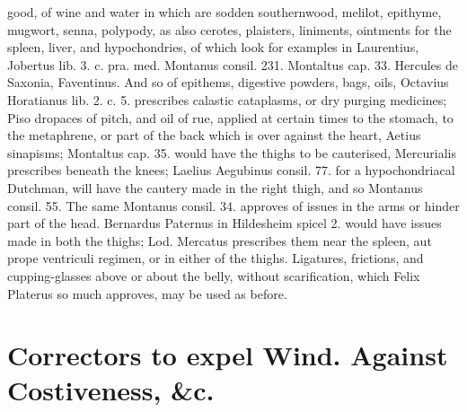 good, of wine and water in which are sodden southernwood, melilot,
epithyme, mugwort, senna, polypody, as also cerotes,
plaisters, liniments, ointments for the spleen, liver, and
hypochondries, of which look for examples in Laurentius, Jobertus lib.
3. c. pra. med. Montanus consil. 231. Montaltus cap. 33. Hercules de
Saxonia, Faventinus. And so of epithems, digestive powders, bags, oils,
Octavius Horatianus lib. 2. c. 5. prescribes calastic cataplasms, or
dry purging medicines; Piso dropaces of pitch, and oil of rue,
applied at certain times to the stomach, to the metaphrene, or part of
the back which is over against the heart, Aetius sinapisms; Montaltus
cap. 35. would have the thighs to be cauterised, Mercurialis
prescribes beneath the knees; Laelius Aegubinus consil. 77. for a
hypochondriacal Dutchman, will have the cautery made in the right
thigh, and so Montanus consil. 55. The same Montanus consil. 34.
approves of issues in the arms or hinder part of the head. Bernardus
Paternus in Hildesheim spicel 2. would have  issues made in both
the thighs; Lod. Mercatus prescribes them near the spleen, aut
prope ventriculi regimen, or in either of the thighs. Ligatures,
frictions, and cupping-glasses above or about the belly, without
scarification, which Felix Platerus so much approves, may be used
as before.

\section[To expel Wind. Against Constipation]{Correctors to expel Wind. Against Costiveness, \&c.}

